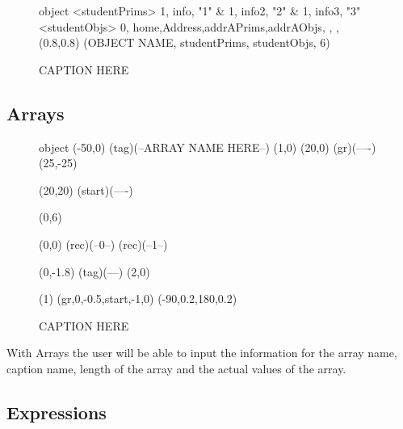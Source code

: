 \documentclass[10pt,a4paper,english]{article}
\begin{document}
\newpage
\thispagestyle{fancy}
\begin{flushleft}
\begin {figure}
\Draw
 {object}
\Indirect \Table <studentPrims>
{  1, info, "1" 		&
   1, info2,  "2"		&
   1, info3,  "3"		
}
\Indirect \Table <studentObjs>
 {  0, home,Address,addrAPrims,addrAObjs, , , }
  \Scale (0.8,0.8)
\OD (OBJECT NAME, studentPrims, studentObjs, 6)
    \EndDraw
\caption {CAPTION HERE}
\label {fig:simpleStudent}
\end {figure}

\subsection*{Arrays}

\newcommand{\ArrayName}
{ARRAY NAME HERE}
\newcommand{\Caption}
{CAPTION HERE}
\newcommand{\ArrayLengthMinusOne}
{6}
\newcommand{\0}
{0}
\newcommand{\1}
{0}
\newcommand{\2}
{95}
\newcommand{\3}
{0}
\newcommand{\4}
{0}
\newcommand{\5}
{0}
\newcommand{\6}
{0}
\newcommand{\7}
{0}
\newcommand{\8}
{0}
\newcommand{\9}
{0}
\newcommand{\ten}
{0}
\newcommand{\eleven}
{0}
\begin {figure}

\Draw

 {object}
\Move(-50,0)
\Node(tag)(--\ArrayName--)
\MoveToExit(1,0)
\Move(20,0)
\ORectNode(gr)(----)
\Move (25,-25)

\MinNodeSize(20,20)
\Node(start)(----)

\Do(0,\ArrayLengthMinusOne)
{  
	\IF 
    	\EqInt(0,0) 				
        	\THEN
 				\RectNode(rec)(--0--)
   \ELSE
   		\RectNode(rec)(--1--)
   		
 		   \FI
   { 	\MoveToExit(0,-1.8)
 	\Node(tag)(--\DoReg--)
   }
   \MoveToExit(2,0)
}
\ArrowHeads(1)
\CurvedEdgeAt(gr,0,-0.5,start,-1,0) (-90,0.2,180,0.2)
\EndDraw
\caption {\Caption}
\label {fig:array}
\end {figure}

With Arrays the user will be able to input the information for the array name, caption name, length of the array and the actual values of the array.  

\subsection*{Expressions}


\end{flushleft}
\end{document}
